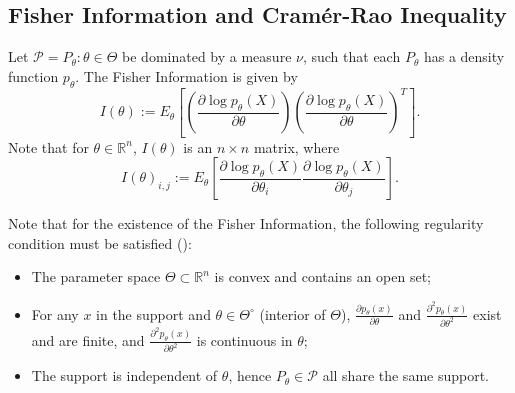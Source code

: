 \subsection{Fisher Information and Cramér-Rao Inequality}
\label{fisher-cramer-rao}

\begin{definition}
	Let $\mathcal P={P_\theta: \theta \in \Theta}$ be dominated by a measure $\nu$,
	such that each $P_\theta$ has a density function $p_\theta$. The Fisher
	Information is given by
	\begin{equation}
		I(\theta) := E_\theta \left[
			\left(
			\frac{\partial  \log p_\theta(X)}{\partial \theta}
			\right)
			\left(
			\frac{\partial  \log p_\theta(X)}{\partial \theta}
			\right)^T
			\right].
	\end{equation}
	Note that for $\theta \in \mathbb R^n$, $I(\theta)$ is an $n\times n$ matrix, where
	\begin{equation}
		I(\theta)_{i,j} := E_\theta \left[
			\frac{\partial  \log p_\theta(X)}{\partial \theta_i}
			\frac{\partial  \log p_\theta(X)}{\partial \theta_j}
			\right].
	\end{equation}
\end{definition}

Note that for the existence of the Fisher Information, the following regularity
condition must be satisfied (\citep{gentle2020}):
\begin{itemize}
	\item The parameter space $\Theta \subset \mathbb R^n$ is convex and contains an open set;
	\item For any $x$ in the support and $\theta \in \Theta^\circ$ (interior of $\Theta$),
	      $\frac{\partial p_\theta(x)}{\partial \theta}$ and
	      $\frac{\partial^2 p_\theta(x)}{\partial \theta^2}$ exist and are finite, and
	      $\frac{\partial^2 p_\theta(x)}{\partial \theta^2}$ is continuous in $\theta$;
	\item The support is independent of $\theta$, hence $P_\theta \in \mathcal P$ all
	      share the same support.
\end{itemize}

